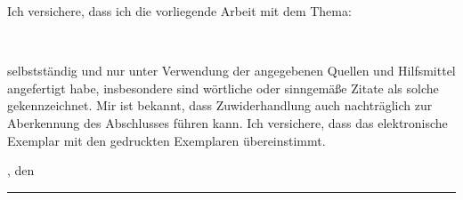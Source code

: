 Ich versichere, dass ich die vorliegende Arbeit mit dem Thema:

\begin{center}
\textit{\glqq\titel\grqq}\\[1em]
\end{center}
			
selbstständig und nur unter Verwendung der angegebenen Quellen und Hilfsmittel angefertigt habe, insbesondere sind wörtliche oder sinngemäße Zitate als solche gekennzeichnet. Mir ist bekannt, dass Zuwiderhandlung auch nachträglich zur Aberkennung des Abschlusses führen kann. Ich versichere, dass das elektronische Exemplar mit den gedruckten Exemplaren übereinstimmt.
\par
\ort, den \eingereicht


\rule[-0.2cm]{5cm}{0.5pt}

\textsc{\autor} 
